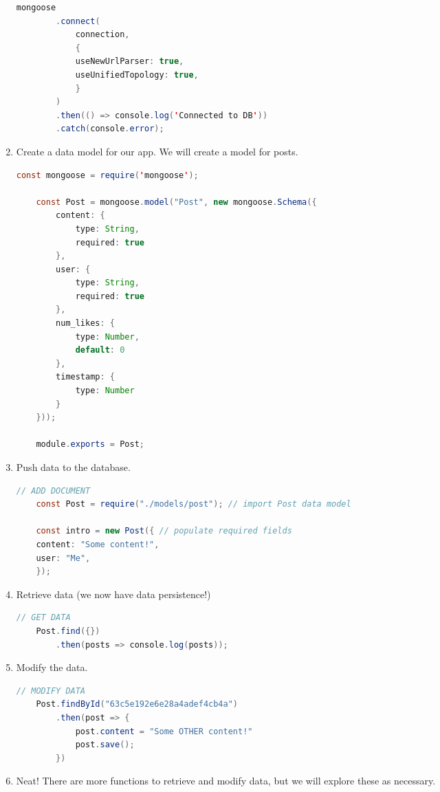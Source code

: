 \begin{enumerate}
\begin{lstlisting}[language=Java]
    mongoose
        .connect(
            connection,
            {
            useNewUrlParser: true,
            useUnifiedTopology: true,
            }
        )
        .then(() => console.log('Connected to DB'))
        .catch(console.error);
    \end{lstlisting}
    \item Create a data model for our app. We will create a model for posts.
    \begin{lstlisting}[language=Java]
    const mongoose = require('mongoose');

    const Post = mongoose.model("Post", new mongoose.Schema({
        content: {
            type: String,
            required: true
        },
        user: {
            type: String,
            required: true
        },
        num_likes: {
            type: Number,
            default: 0
        },
        timestamp: {
            type: Number
        }
    }));

    module.exports = Post;
    \end{lstlisting}
    \item Push data to the database.
    \begin{lstlisting}[language=Java]
    // ADD DOCUMENT
    const Post = require("./models/post"); // import Post data model

    const intro = new Post({ // populate required fields
    content: "Some content!",
    user: "Me",
    });
    \end{lstlisting}
    \item Retrieve data (we now have data persistence!)
    \begin{lstlisting}[language=Java]
    // GET DATA
    Post.find({})
        .then(posts => console.log(posts));
    \end{lstlisting}
    \item Modify the data.
    \begin{lstlisting}[language=Java]
    // MODIFY DATA
    Post.findById("63c5e192e6e28a4adef4cb4a")
        .then(post => {
            post.content = "Some OTHER content!"
            post.save();
        })
    \end{lstlisting}
    \item Neat! There are more functions to retrieve and modify data, but we will explore these as necessary.
\end{enumerate}


